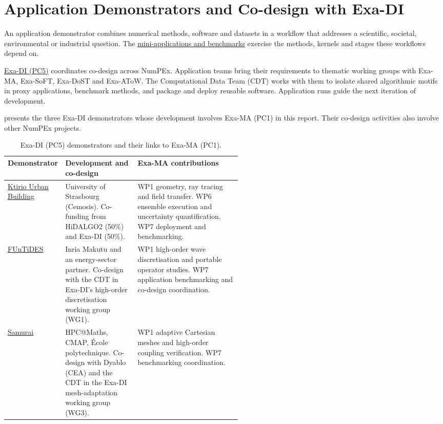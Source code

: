 \chapter{Application Demonstrators and Co-design with Exa-DI}
\label{chap:exadi-demonstrators}
\label{sec:pc5:demonstrator-context}

\providecommand{\ExaDIRef}[3]{\hyperref[#1]{#2}}

An application demonstrator combines numerical methods, software and
datasets in a workflow that addresses a scientific, societal, environmental
or industrial question. The \ExaDIRef{chap:applications}{mini-applications and benchmarks}{https://exa-ma.numpex.fr/deliverables.html}
exercise the methods, kernels and stages these workflows depend on.

\href{https://numpex.org/exadi-development-and-integration/}{Exa-DI (PC5)}
coordinates co-design across NumPEx. Application teams bring their
requirements to thematic working groups with Exa-MA, Exa-SoFT, Exa-DoST
and Exa-AToW. The Computational Data Team (CDT) works with them to isolate
shared algorithmic motifs in proxy applications, benchmark methods, and
package and deploy reusable software. Application runs guide the next
iteration of development.

 presents the three Exa-DI demonstrators
whose development involves Exa-MA (PC1) in this report. Their co-design
activities also involve other NumPEx projects.

\begin{table}[H]
\centering\small
\caption{Exa-DI (PC5) demonstrators and their links to Exa-MA (PC1).}
\label{tab:exadi-demonstrators}
\begin{tabularx}{\linewidth}{@{}>{\raggedright\arraybackslash}p{0.22\linewidth}
  >{\raggedright\arraybackslash}p{0.31\linewidth}
  >{\raggedright\arraybackslash}X@{}}
\toprule
\textbf{Demonstrator} & \textbf{Development and co-design} & \textbf{Exa-MA contributions}\\
\midrule
\hyperref[sec:pc5:ktirio-urban-building]{Ktirio Urban Building} &
University of Strasbourg (Cemosis). Co-funding from HiDALGO2 (50\%)
and Exa-DI (50\%). &
WP1 geometry, ray tracing and field transfer. WP6 ensemble execution and
uncertainty quantification. WP7 deployment and benchmarking.\\
\addlinespace
\hyperref[sec:pc5:funtides]{FUnTiDES} &
Inria Makutu and an energy-sector partner. Co-design with the CDT in
Exa-DI's high-order discretisation working group (WG1). &
WP1 high-order wave discretisation and portable operator studies.
WP7 application benchmarking and co-design coordination.\\
\addlinespace
\hyperref[sec:pc5:samurai]{Samurai} &
HPC@Maths, CMAP, École polytechnique. Co-design with Dyablo (CEA)
and the CDT in the Exa-DI mesh-adaptation working group (WG3). &
WP1 adaptive Cartesian meshes and high-order coupling verification.
WP7 benchmarking coordination.\\
\bottomrule
\end{tabularx}
\end{table}

